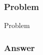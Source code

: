 
\begin{frame}
\frametitle{Problem}

\begin{block}{Problem}
\end{block}
\end{frame}

\begin{frame}
\frametitle{Answer}


\end{frame}